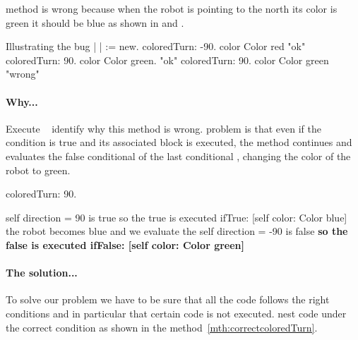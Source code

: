 {

 method is wrong because when the robot is pointing to the north\add{,}  its color is green it should be blue\add{,} as shown in  and .  

\begin{scriptwithtitle}{Illustrating the bug}\label{scr:illustbug} 
| \caro |
\caro := \Turtle new.
\caro coloredTurn: -90.
\caro color \pr  Color red           "ok"
\caro coloredTurn: 90.
\caro color \pr Color green.      "ok"
\caro coloredTurn: 90.
\caro color \pr Color green      "wrong"
\end{scriptwithtitle}


\paragraph{Why...} Execute  ~  identify why this method is wrong.  problem is that even if the condition   is true and  its associated block is executed, the method continues and evaluates the false conditional  of the last conditional , changing  the color of the robot to green.


\begin{nalltt}
\caro coloredTurn: 90.

   self direction = 90 \textrm{is true}
       \textrm{so the true  is executed} ifTrue: [self color: Color blue]
       \textrm{the robot becomes blue and we evaluate the }
   self direction = -90 \textrm{is false} 
       \textbf{\textrm{so the false  is executed} ifFalse: [self color: Color green]}
\end{nalltt}


\paragraph{The solution...} To solve our problem we have to be sure that all the code follows the right conditions\add{,} and in particular that certain code is not executed.  nest code under the correct condition as shown in the method~\ref{mth:correctcoloredTurn}.

}
